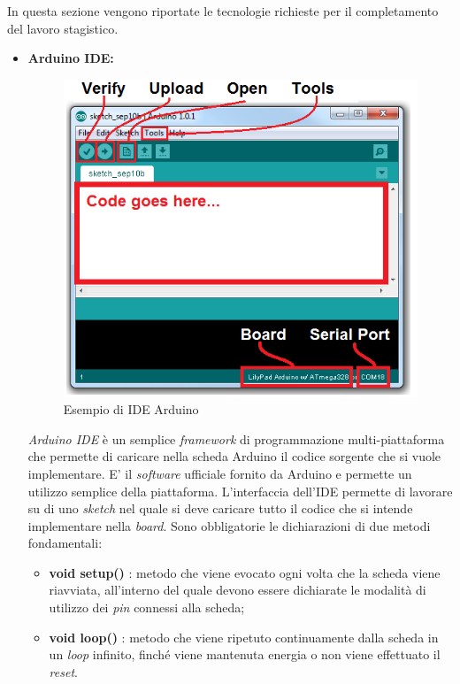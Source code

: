 In questa sezione vengono riportate le tecnologie richieste per il completamento del lavoro stagistico.
\begin{itemize}

	\item \textbf{Arduino IDE:} \\
	\begin{figure}[htbp]
	\centering
	\includegraphics[scale=.4]{./capitoli/capitolo2/img/ide}
	\caption{Esempio di IDE Arduino}
	\end{figure}
	\textit{Arduino IDE} è un semplice \textit{framework} di programmazione multi-piattaforma che permette di caricare nella scheda Arduino il codice sorgente che si vuole implementare. E' il \textit{software }ufficiale fornito da Arduino e permette un utilizzo semplice della piattaforma. L'interfaccia dell'IDE permette di lavorare su di uno \textit{sketch} nel quale si deve caricare tutto il codice che si intende implementare nella \textit{board}. Sono obbligatorie le dichiarazioni di due metodi fondamentali:
	\begin{itemize}
		\item \textbf{void setup()} : metodo che viene evocato ogni volta che la scheda viene riavviata, all'interno del quale devono essere dichiarate le modalità di utilizzo dei \textit{pin} connessi alla scheda;
		\item \textbf{void loop()} : metodo che viene ripetuto continuamente dalla scheda in un \textit{loop} infinito, finché viene mantenuta energia o non viene effettuato il \textit{reset}. 	
	

\end{itemize}
\end{itemize}
